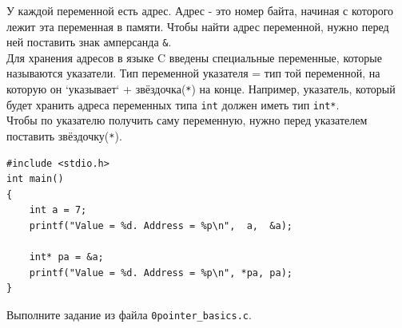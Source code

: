 \documentclass{article}
\begin{document}
У каждой переменной есть адрес. Адрес - это номер байта, начиная с которого лежит эта переменная в памяти. Чтобы найти адрес переменной, нужно перед ней поставить знак амперсанда \texttt{\&}. \\
Для хранения адресов в языке C введены специальные переменные, которые называются указатели. Тип переменной указателя = тип той переменной, на которую он `указывает` + звёздочка(\texttt{*}) на конце. Например, указатель, который будет хранить адреса переменных типа \texttt{int} должен иметь тип \texttt{int*}. \\
Чтобы по указателю получить саму переменную, нужно перед указателем поставить звёздочку(\texttt{*}).
\begin{lstlisting}
#include <stdio.h>
int main()
{
    int a = 7;
    printf("Value = %d. Address = %p\n",  a,  &a);
    
    int* pa = &a;
    printf("Value = %d. Address = %p\n", *pa, pa);
}
\end{lstlisting}
Выполните задание из файла \texttt{0pointer\_basics.c}.
\end{document}
